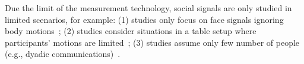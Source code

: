 Due the limit of the measurement technology, social signals are only studied in limited scenarios, for example: (1) studies only focus on face signals ignoring body motions~\cite{messinger2009automated, lucas_trust_2016,mckeown2012semaine}; (2) studies consider situations in a table setup where participants' motions are limited~\cite{carletta2005ami, Lepri-12,messinger2009automated, nojavanasghari2016emoreact, lucas_trust_2016,mckeown2012semaine}; (3) studies assume only few number of people (e.g., dyadic communications)~\cite{messinger2009automated,nojavanasghari2016emoreact, lucas_trust_2016, katsimerou2016crowdsourcing,mckeown2012semaine,gunes2006bimodal}.\\
\mbox{ }\\
% 
%
%
%
%
%
%
